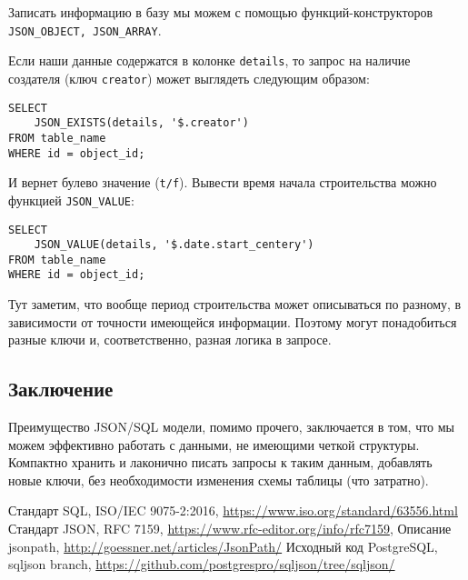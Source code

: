 \documentclass[10pt, a5paper]{article}
\begin{document}
Записать информацию в базу мы можем с помощью функций-конструкторов
\texttt{JSON\_OBJECT, JSON\_ARRAY}.

Если наши данные содержатся в колонке \texttt{details}, то запрос на наличие создателя (ключ \texttt{creator})
может выглядеть следующим образом:
\begin{verbatim}
SELECT 
    JSON_EXISTS(details, '$.creator') 
FROM table_name 
WHERE id = object_id;
\end{verbatim}
И вернет булево значение (\texttt{t/f}). 
Вывести время начала строительства можно функцией \texttt{JSON\_VALUE}:
\begin{verbatim}
SELECT 
    JSON_VALUE(details, '$.date.start_centery') 
FROM table_name 
WHERE id = object_id;
\end{verbatim}
Тут заметим, что вообще период строительства может описываться по разному, 
в зависимости от точности имеющейся информации. 
Поэтому могут понадобиться разные ключи и, соответственно, разная логика в запросе. 

\subsection*{Заключение}
Преимущество JSON/SQL модели, помимо прочего, заключается в том, 
что мы можем эффективно работать с данными, не имеющими четкой структуры. 
Компактно хранить и лаконично писать запросы к таким данным, 
добавлять новые ключи, без необходимости изменения схемы таблицы (что затратно). 

\begin{thebibliography}{9}
 Стандарт SQL, ISO/IEC 9075-2:2016, \url{https://www.iso.org/standard/63556.html}
 Стандарт JSON, RFC 7159, \url{https://www.rfc-editor.org/info/rfc7159}, 
 Описание jsonpath, \url{http://goessner.net/articles/JsonPath/}
 Исходный код PostgreSQL, sqljson branch, \url{https://github.com/postgrespro/sqljson/tree/sqljson/}
\end{thebibliography}
\end{document}
